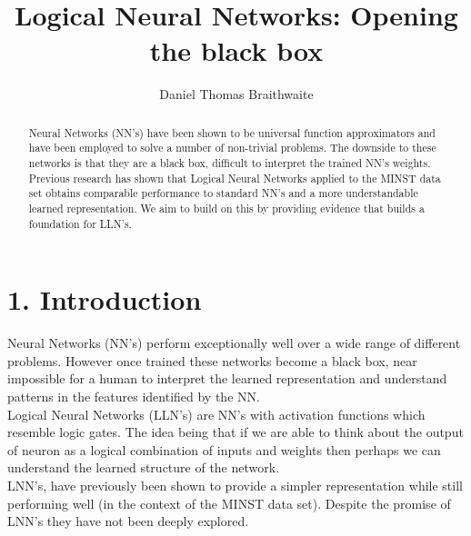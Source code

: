 \documentclass[11pt, a4paper, twoside, openright]{report}
\title{Logical Neural Networks: Opening the black box}
\author{Daniel Thomas Braithwaite}
\date{}
\begin{document}
\frontmatter


\begin{abstract}
Neural Networks (NN's) have been shown to be universal function approximators and have been employed to solve a number of non-trivial problems. The downside to these networks is that they are a black box, difficult to interpret the trained NN's weights. Previous research has shown that Logical Neural Networks applied to the MINST data set obtains comparable performance to standard NN's and a more understandable learned representation. We aim to build on this by providing evidence that builds a foundation for LLN's.
\end{abstract}


\maketitle




\mainmatter


\section*{1. Introduction}

Neural Networks (NN's) perform exceptionally well over a wide range of different problems. However once trained these networks become a black box, near impossible for a human to interpret the learned representation and understand patterns in the features identified by the NN. \\ 

Logical Neural Networks (LLN's) are NN's with activation functions which resemble logic gates. The idea being that if we are able to think about the output of neuron as a logical combination of inputs and weights then perhaps we can understand the learned structure of the network. \\

LNN's, have previously been shown to provide a simpler representation while still performing well \cite{LearningLogicalActivations} (in the context of the MINST data set). Despite the promise of LNN's they have not been deeply explored.
\end{document}
